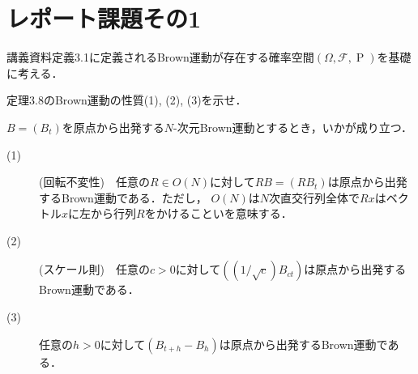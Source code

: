 

\section{レポート課題その1}

講義資料定義3.1に定義されるBrown運動が存在する確率空間$(\Omega, \mathcal{F}, \operatorname{P})$を基礎に考える．

定理3.8のBrown運動の性質(1), (2), (3)を示せ．
\begin{thm}[定理3.8]
$B = (B_t)$を原点から出発する$N$-次元Brown運動とするとき，いかが成り立つ．
\begin{description}
	\item[(1)](回転不変性)　任意の$R \in O(N)$に対して$RB = (RB_t)$は原点から出発するBrown運動である．ただし，
		$O(N)$は$N$次直交行列全体で$Rx$はベクトル$x$に左から行列$R$をかけることいを意味する．
	\item[(2)](スケール則)　任意の$c > 0$に対して$((1/\sqrt{c})B_{ct})$は原点から出発するBrown運動である．
	\item[(3)] 任意の$h > 0$に対して$(B_{t+h} - B_h)$は原点から出発するBrown運動である．
	\begin{comment}
	\item[(4)] $B$の各座標が定める実数値確率過程を$B_i = (B_i(t))\ (i = 1,2,\cdots,N)$とすると，
		$B_i\ (i=1,2,\cdots,N)$は独立な1次元Brown運動である．逆に，独立な1次元Brown運動
		$B_i\ (i=1,2,\cdots,N)$が与えられたとき$B(t) = {}^t(B_1(t),\cdots,B_N(t))$とおくと
		$(B(t))$は$N$次元Brown運動である．
	\end{comment}
\end{description}
\end{thm}

